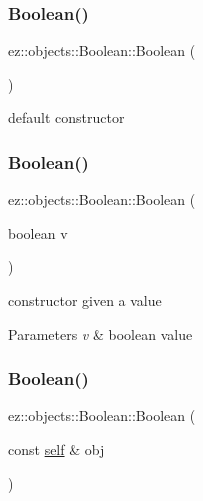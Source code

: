 \subsubsection{\texorpdfstring{Boolean()}{Boolean()}\hspace{0.1cm}{\footnotesize\ttfamily [1/3]}}
{\footnotesize\ttfamily ez\+::objects\+::\+Boolean\+::\+Boolean (\begin{DoxyParamCaption}{ }\end{DoxyParamCaption})\hspace{0.3cm}{\ttfamily [inline]}}

default constructor \mbox{\label{classez_1_1objects_1_1Boolean_a38c5fa82d29626076a027b615ddc64b8}} 
\subsubsection{\texorpdfstring{Boolean()}{Boolean()}\hspace{0.1cm}{\footnotesize\ttfamily [2/3]}}
{\footnotesize\ttfamily ez\+::objects\+::\+Boolean\+::\+Boolean (\begin{DoxyParamCaption}\item[{boolean}]{v }\end{DoxyParamCaption})\hspace{0.3cm}{\ttfamily [inline]}}

constructor given a value 
\begin{DoxyParams}{Parameters}
{\em v} & boolean value \\
\hline
\end{DoxyParams}
\mbox{\label{classez_1_1objects_1_1Boolean_a59cf0c39db6caa85a04e26e179523252}} 
\subsubsection{\texorpdfstring{Boolean()}{Boolean()}\hspace{0.1cm}{\footnotesize\ttfamily [3/3]}}
{\footnotesize\ttfamily ez\+::objects\+::\+Boolean\+::\+Boolean (\begin{DoxyParamCaption}\item[{const \hyperlink{classez_1_1objects_1_1Boolean}{self} \&}]{obj }\end{DoxyParamCaption})\hspace{0.3cm}{\ttfamily [inline]}}

